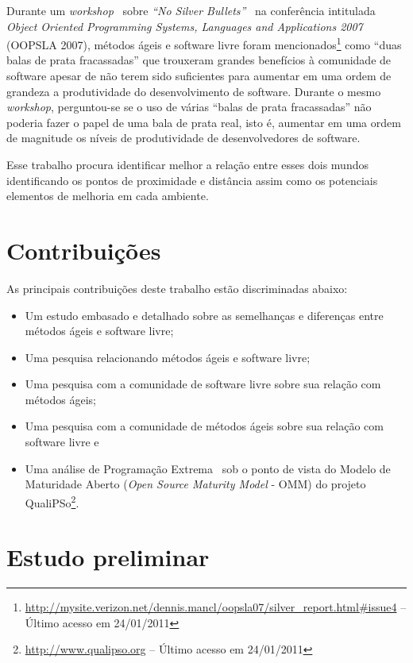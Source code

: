 Durante um \emph{workshop}~\cite{OOPSLA07} sobre \emph{``No Silver
  Bullets''}~\cite{Brooks1987} na conferência intitulada \emph{Object
  Oriented Programming Systems, Languages and Applications 2007}
(OOPSLA 2007), métodos ágeis e software livre foram
mencionados\footnote{\url{http://mysite.verizon.net/dennis.mancl/oopsla07/silver_report.html\#issue4}
  -- Último acesso em 24/01/2011} como ``duas balas de prata
fracassadas'' que trouxeram grandes benefícios à comunidade de
software apesar de não terem sido suficientes para aumentar em uma
ordem de grandeza a produtividade do desenvolvimento de
software. Durante o mesmo \emph{workshop}, perguntou-se se o uso de
várias ``balas de prata fracassadas'' não poderia fazer o papel de uma
bala de prata real, isto é, aumentar em uma ordem de magnitude os
níveis de produtividade de desenvolvedores de software.

Esse trabalho procura identificar melhor a relação entre esses dois
mundos identificando os pontos de proximidade e distância assim como
os potenciais elementos de melhoria em cada ambiente.


\section{Contribuições}
\label{sec:contribucoes}

As principais contribuições deste trabalho estão discriminadas abaixo:

\begin{itemize}
\item Um estudo embasado e detalhado sobre as semelhanças e diferenças
  entre métodos ágeis e software livre;
\item Uma pesquisa relacionando métodos ágeis e software livre;
\item Uma pesquisa com a comunidade de software livre sobre sua
  relação com métodos ágeis;
\item Uma pesquisa com a comunidade de métodos ágeis sobre sua relação
  com software livre e
\item Uma análise de Programação Extrema~\cite{XP01} sob o ponto de
  vista do Modelo de Maturidade Aberto (\emph{Open Source Maturity
    Model} - OMM) do projeto
  QualiPSo\footnote{\url{http://www.qualipso.org} -- Último acesso em
    24/01/2011}.
\end{itemize}

\section{Estudo preliminar}
\label{sec:estudo-preliminar}

